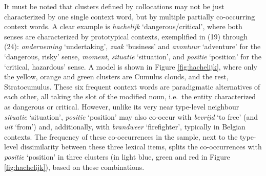 \documentclass[
]{book}
\begin{document}
It must be noted that clusters defined by collocations may not be just characterized by one single context word, but by multiple partially co-occurring context words. A clear example is \emph{hachelijk} `dangerous/critical', where both senses are characterized by prototypical contexts, exemplified in (19) through (24): \emph{onderneming} `undertaking', \emph{zaak} `business' and \emph{avontuur} `adventure' for the `dangerous, risky' sense, \emph{moment}, \emph{situatie} `situation', and \emph{positie} `position' for the `critical, hazardous' sense. A model is shown in Figure \ref{fig:hachelijk}, where only the yellow, orange and green clusters are Cumulus clouds, and the rest, Stratocumulus.
These six frequent context words are paradigmatic alternatives of each other, all taking the slot of the modified noun, i.e.~the entity characterized as dangerous or critical. However, unlike its very near type-level neighbour \emph{situatie} `situation', \emph{positie} `position' may also co-occur with \emph{bevrijd} `to free' (and \emph{uit} `from') and, additionally, with \emph{brandweer} `firefighter', typically in Belgian contexts. The frequency of these co-occurrences in the sample, next to the type-level dissimilarity between these three lexical items, splits the co-occurrences with \emph{positie} `position' in three clusters (in light blue, green and red in Figure \ref{fig:hachelijk}), based on these combinations.
\end{document}
